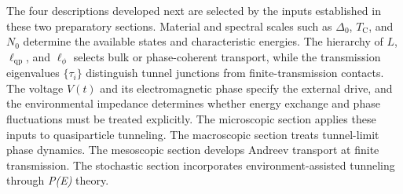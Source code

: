             The four descriptions developed next are selected by the inputs established in these two preparatory sections. Material and spectral scales such as $\Delta_0$, $T_\mathrm{C}$, and $N_0$ determine the available states and characteristic energies. The hierarchy of $L$, $\ell_\mathrm{qp}$, and $\ell_\phi$ selects bulk or phase-coherent transport, while the transmission eigenvalues $\{\tau_i\}$ distinguish tunnel junctions from finite-transmission contacts. The voltage $V(t)$ and its electromagnetic phase specify the external drive, and the environmental impedance determines whether energy exchange and phase fluctuations must be treated explicitly. The microscopic section applies these inputs to quasiparticle tunneling. The macroscopic section treats tunnel-limit phase dynamics. The mesoscopic section develops Andreev transport at finite transmission. The stochastic section incorporates environment-assisted tunneling through \textit{P(E)} theory.

